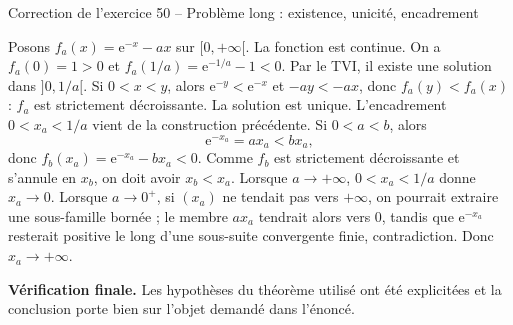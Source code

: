 \documentclass[11pt,a4paper]{article}
\newcommand{\e}{\mathrm{e}}
\begin{document}
\begin{corrbox}{Correction de l'exercice 50 -- Problème long : existence, unicité, encadrement}

Posons $f_a(x)=\e^{-x}-ax$ sur $[0,+\infty[$. La fonction est continue. On a $f_a(0)=1>0$ et $f_a(1/a)=\e^{-1/a}-1<0$. Par le TVI, il existe une solution dans $]0,1/a[$. Si $0<x<y$, alors $\e^{-y}<\e^{-x}$ et $-ay<-ax$, donc $f_a(y)<f_a(x)$ : $f_a$ est strictement décroissante. La solution est unique.
L'encadrement $0<x_a<1/a$ vient de la construction précédente. Si $0<a<b$, alors
\[
\e^{-x_a}=a x_a < b x_a,
\]
donc $f_b(x_a)=\e^{-x_a}-b x_a<0$. Comme $f_b$ est strictement décroissante et s'annule en $x_b$, on doit avoir $x_b<x_a$.
Lorsque $a\to+\infty$, $0<x_a<1/a$ donne $x_a\to0$. Lorsque $a\to0^+$, si $(x_a)$ ne tendait pas vers $+\infty$, on pourrait extraire une sous-famille bornée ; le membre $a x_a$ tendrait alors vers $0$, tandis que $\e^{-x_a}$ resterait positive le long d'une sous-suite convergente finie, contradiction. Donc $x_a\to+\infty$.

\medskip
\textbf{Vérification finale.} Les hypothèses du théorème utilisé ont été explicitées et la conclusion porte bien sur l'objet demandé dans l'énoncé.
\end{corrbox}
\end{document}
